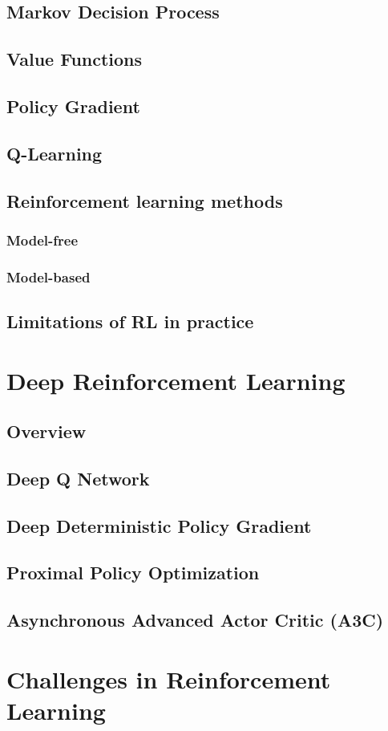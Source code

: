 \subsection{Markov Decision Process}
\subsection{Value Functions}
\subsection{Policy Gradient}
\subsection{Q-Learning}
\subsection{Reinforcement learning methods}
    \subsubsection{Model-free}
    \subsubsection{Model-based}
\subsection{Limitations of RL in practice}

\section{Deep Reinforcement Learning}
\subsection{Overview}
\subsection{Deep Q Network}
\subsection{Deep Deterministic Policy Gradient}
\subsection{Proximal Policy Optimization}
\subsection{Asynchronous Advanced Actor Critic (\textbf{A3C})}


\section{Challenges in Reinforcement Learning}